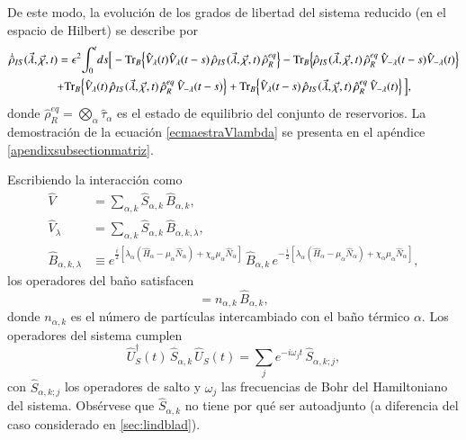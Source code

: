 De este modo, la evolución de los grados de libertad del sistema reducido (en el espacio de Hilbert) se describe por
\begin{multline}
    \dot{\hat{\rho}}_{IS}(\vec{\lambda},\vec{\chi},t) 
    = \epsilon^{2}\!\int_{0}^{t}\!ds \Big[
      - \textnormal{Tr}_{B}\!\left\{\hat{V}_{\lambda}(t)\hat{V}_{\lambda}(t-s)\,\hat{\rho}_{IS}(\vec{\lambda},\vec{\chi},t)\,\hat{\rho}^{eq}_{R}\right\}
      - \textnormal{Tr}_{B}\!\left\{\hat{\rho}_{IS}(\vec{\lambda},\vec{\chi},t)\,\hat{\rho}^{eq}_{R}\,\hat{V}_{-\lambda}(t-s)\hat{V}_{-\lambda}(t)\right\} \\
      + \textnormal{Tr}_{B}\!\left\{\hat{V}_{\lambda}(t)\,\hat{\rho}_{IS}(\vec{\lambda},\vec{\chi},t)\,\hat{\rho}^{eq}_{R}\,\hat{V}_{-\lambda}(t-s)\right\}
      + \textnormal{Tr}_{B}\!\left\{\hat{V}_{\lambda}(t-s)\,\hat{\rho}_{IS}(\vec{\lambda},\vec{\chi},t)\,\hat{\rho}^{eq}_{R}\,\hat{V}_{-\lambda}(t)\right\}
    \Big],
    \label{ecmaestraVlambda}
\end{multline}
donde \(\hat{\rho}^{eq}_{R}=\bigotimes_{\alpha}\hat{\tau}_{\alpha}\) es el estado de equilibrio del conjunto de reservorios. La demostración de la ecuación \eqref{ecmaestraVlambda} se presenta en el apéndice \ref{apendixsubsectionmatriz}.

Escribiendo la interacción como
\begin{align*}
    \hat{V} &= \sum_{\alpha,k}\hat{S}_{\alpha,k}\,\hat{B}_{\alpha,k}, \\
    \hat{V}_{\lambda} &= \sum_{\alpha,k}\hat{S}_{\alpha,k}\,\hat{B}_{\alpha,k,\lambda}, \\
    \hat{B}_{\alpha,k,\lambda} 
      &\equiv e^{\frac{i}{2}[\lambda_{\alpha}(\hat{H}_{\alpha} - \mu_{\alpha}\hat{N}_{\alpha}) + \chi_{\alpha}\mu_{\alpha}\hat{N}_{\alpha}]}\,
               \hat{B}_{\alpha,k}\,
               e^{-\frac{i}{2}[\lambda_{\alpha}(\hat{H}_{\alpha} - \mu_{\alpha}\hat{N}_{\alpha}) + \chi_{\alpha}\mu_{\alpha}\hat{N}_{\alpha}]},
\end{align*}
los operadores del baño satisfacen
\begin{equation*}
    [\hat{B}_{\alpha,k},\hat{N}_{\alpha}] = n_{\alpha,k}\,\hat{B}_{\alpha,k},
\end{equation*}
donde \(n_{\alpha,k}\) es el número de partículas intercambiado con el baño térmico \(\alpha\). Los operadores del sistema cumplen
\begin{equation*}
    \hat{U}^{\dagger}_{S}(t)\,\hat{S}_{\alpha,k}\,\hat{U}_{S}(t) 
    = \sum_{j} e^{-i\omega_{j}t}\,\hat{S}_{\alpha,k;j},
\end{equation*}
con \(\hat{S}_{\alpha,k;j}\) los operadores de salto y \(\omega_{j}\) las frecuencias de Bohr del Hamiltoniano del sistema. Obsérvese que \(\hat{S}_{\alpha,k}\) no tiene por qué ser autoadjunto (a diferencia del caso considerado en \ref{sec:lindblad}).

